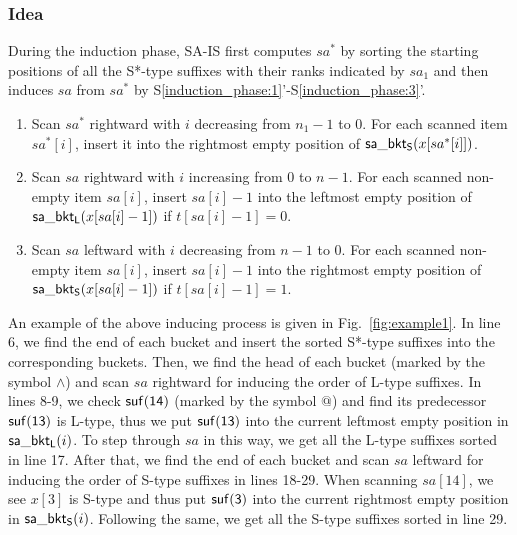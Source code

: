\documentclass[10pt,journal,compsoc]{IEEEtran}
\begin{document}
\subsubsection{Idea} \label{sec:checkers:method_a:idea}

During the induction phase, SA-IS first computes $sa^*$ by sorting the starting positions of all the S*-type suffixes with their ranks indicated by $sa_1$ and then induces $sa$ from $sa^*$ by S\ref{induction_phase:1}'-S\ref{induction_phase:3}'.

\begin{enumerate}[S1']
	
	\item Scan $sa^*$ rightward with $i$ decreasing from $n_1 - 1$ to $0$. For each scanned item $sa^*[i]$, insert it into the rightmost empty position of ${\sf sa\_bkt_S}(x[sa^*[i]])$. \label{induction_phase:1}
	
	\item Scan $sa$ rightward with $i$ increasing from $0$ to $n - 1$. For each scanned non-empty item $sa[i]$, insert $sa[i] - 1$ into the leftmost empty position of ${\sf sa\_bkt_L}(x[sa[i] - 1])$ if $t[sa[i] - 1] = 0$.\label{induction_phase:2}
	
	\item Scan $sa$ leftward with $i$ decreasing from $n - 1$ to $0$. For each scanned non-empty item $sa[i]$, insert $sa[i] - 1$ into the rightmost empty position of ${\sf sa\_bkt_S}(x[sa[i] - 1])$ if $t[sa[i] - 1] = 1$.\label{induction_phase:3}
	
\end{enumerate}

An example of the above inducing process is given in Fig.~\ref{fig:example1}. In line 6, we find the end of each bucket and insert the sorted S*-type suffixes into the corresponding buckets. Then, we find the head of each bucket (marked by the symbol $\wedge$) and scan $sa$ rightward for inducing the order of L-type suffixes. In lines 8-9, we check $\sf suf(14)$ (marked by the symbol $@$) and find its predecessor ${\sf suf(13)}$ is L-type, thus we put ${\sf suf(13)}$ into the current leftmost empty position in ${\sf sa\_bkt_L}(i)$. To step through $sa$ in this way, we get all the L-type suffixes sorted in line 17. After that, we find the end of each bucket and scan $sa$ leftward for inducing the order of S-type suffixes in lines 18-29. When scanning $sa[14]$, we see $x[3]$ is S-type and thus put ${\sf suf(3)}$ into the current rightmost empty position in ${\sf sa\_bkt_S}(i)$. Following the same, we get all the S-type suffixes sorted in line 29.
\end{document}
